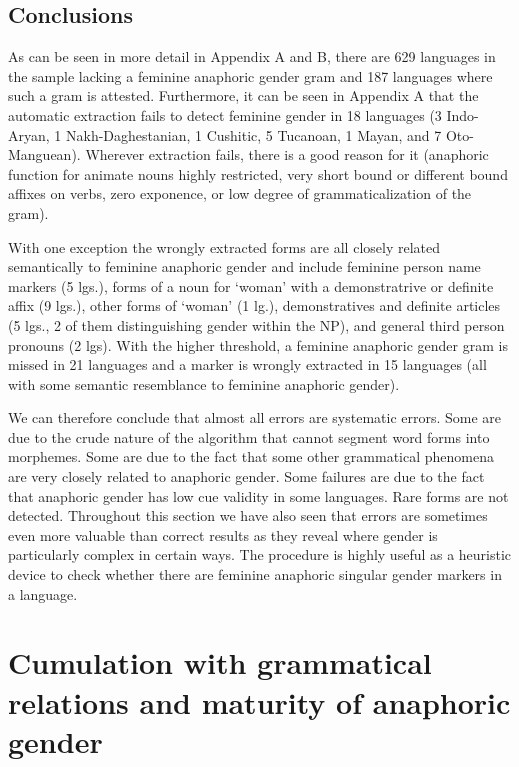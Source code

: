 \documentclass[output=collectionpaper]{langsci/langscibook}
\begin{document}
\subsection{Conclusions}
\label{sec:BW:3.7}

As can be seen in more detail in Appendix A and B, there are 629 languages in the sample lacking a feminine anaphoric gender gram and 187 languages where such a gram is attested. Furthermore, it can be seen in Appendix A that the automatic extraction fails to detect feminine gender in 18 languages (3 Indo-Aryan, 1 Nakh-Daghestanian, 1 Cushitic, 5 Tucanoan, 1 Mayan, and 7 Oto-Manguean). Wherever extraction fails, there is a good reason for it (anaphoric function for animate nouns highly restricted, very short bound or different bound affixes on verbs, zero exponence, or low degree of grammaticalization of the gram).

With one exception the wrongly extracted forms are all closely related semantically to feminine anaphoric gender and include feminine person name markers (5 lgs.), forms of a noun for ‘woman’ with a demonstratrive or definite affix (9 lgs.), other forms of ‘woman’ (1 lg.), demonstratives and definite articles (5 lgs., 2 of them distinguishing gender within the NP), and general third person pronouns (2 lgs). With the higher threshold, a feminine anaphoric gender gram is missed in 21 languages and a marker is wrongly extracted in 15 languages (all with some semantic resemblance to feminine anaphoric gender).

We can therefore conclude that almost all errors are systematic errors. Some are due to the crude nature of the algorithm that cannot segment word forms into morphemes. Some are due to the fact that some other grammatical phenomena are very closely related to anaphoric gender. Some failures are due to the fact that anaphoric gender has low cue validity in some languages. Rare forms are not detected. Throughout this section we have also seen that errors are sometimes even more valuable than correct results as they reveal where gender is particularly complex in certain ways. The procedure is highly useful as a heuristic device to check whether there are feminine anaphoric singular gender markers in a language.

\section{Cumulation with grammatical relations and maturity of anaphoric gender}
\label{sec:BW:4}
\end{document}
